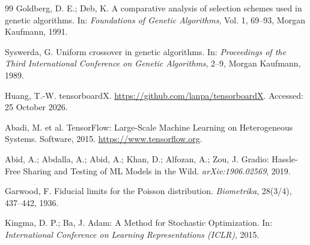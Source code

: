 \documentclass[11pt,a4paper]{article}
\begin{document}
\begin{thebibliography}{99}
Goldberg, D. E.; Deb, K. A comparative analysis of selection schemes used in genetic algorithms. In: \textit{Foundations of Genetic Algorithms}, Vol. 1, 69--93, Morgan Kaufmann, 1991.

Syswerda, G. Uniform crossover in genetic algorithms. In: \textit{Proceedings of the Third International Conference on Genetic Algorithms}, 2--9, Morgan Kaufmann, 1989.

Huang, T.-W. tensorboardX. \url{https://github.com/lanpa/tensorboardX}. Accessed: 25 October 2026.

Abadi, M. et al. TensorFlow: Large-Scale Machine Learning on Heterogeneous Systems. Software, 2015. \url{https://www.tensorflow.org}.

Abid, A.; Abdalla, A.; Abid, A.; Khan, D.; Alfozan, A.; Zou, J. Gradio: Hassle-Free Sharing and Testing of ML Models in the Wild. \textit{arXiv:1906.02569}, 2019.

Garwood, F. Fiducial limits for the Poisson distribution. \textit{Biometrika}, 28(3/4), 437--442, 1936.

Kingma, D. P.; Ba, J. Adam: A Method for Stochastic Optimization. In: \textit{International Conference on Learning Representations (ICLR)}, 2015.

\end{thebibliography}
\end{document}
